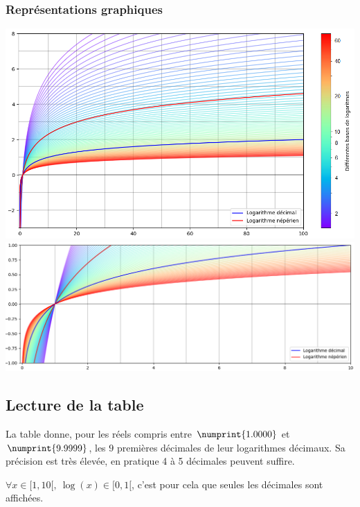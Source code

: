 \documentclass[a4paper]{article}
\begin{document}
\let\thefootnote\relax{}


	
\subsubsection*{Représentations graphiques}

{\noindent \hspace{0.15cm}\includegraphics[scale=0.6]{log.png}}\\
\vspace{0.15cm}
{\noindent \includegraphics[scale=0.5]{log_zoom.png}}

\pagebreak

\subsection{Lecture de la table}

La table donne, pour les réels compris entre $\numprint{1.0000}$ et $\numprint{9.9999}$, les $9$ premières décimales de leur logarithmes décimaux. Sa précision est très élevée, en pratique 4 à 5 décimales peuvent suffire.

$\forall x \in [1, 10[,~\log(x) \in [0, 1[$, c'est pour cela que seules les décimales sont affichées.\\
\end{document}
